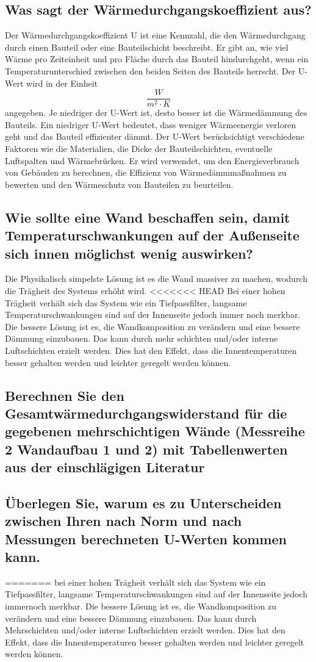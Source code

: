 \subsection{Was sagt der Wärmedurchgangskoeffizient aus?}
Der Wärmedurchgangskoeffizient U ist eine Kennzahl, die den Wärmedurchgang durch einen Bauteil oder eine Bauteilschicht beschreibt. 
Er gibt an, wie viel Wärme pro Zeiteinheit und pro Fläche durch das Bauteil hindurchgeht, wenn ein Temperaturunterschied zwischen den beiden Seiten des Bauteils herrscht.
Der U-Wert wird in der Einheit $$\frac{W}{m^2 \cdot K}$$ angegeben. Je niedriger der U-Wert ist, desto besser ist die Wärmedämmung des Bauteils. 
Ein niedriger U-Wert bedeutet, dass weniger Wärmeenergie verloren geht und das Bauteil effizienter dämmt.
Der U-Wert berücksichtigt verschiedene Faktoren wie die Materialien, die Dicke der Bauteilschichten, eventuelle Luftspalten und Wärmebrücken. 
Er wird verwendet, um den Energieverbrauch von Gebäuden zu berechnen, die Effizienz von Wärmedämmmaßnahmen zu bewerten und den Wärmeschutz von Bauteilen zu beurteilen.
\subsection{Wie sollte eine Wand beschaffen sein, damit Temperaturschwankungen auf der Außenseite sich innen möglichst wenig auswirken?}
Die Physikalisch simpelste Lösung ist es die Wand massiver zu machen, wodurch die Trägheit des Systems erhöht wird.
<<<<<<< HEAD
Bei einer hohen Trägheit verhält sich das System wie ein Tiefpassfilter, langsame Temperaturschwankungen sind auf der Innenseite jedoch immer noch merkbar.
Die bessere Lösung ist es, die Wandkomposition zu verändern und eine bessere Dämmung einzubauen.
Das kann durch mehr schichten und/oder interne Luftschichten erzielt werden.
Dies hat den Effekt, dass die Innentemperaturen besser gehalten werden und leichter geregelt werden können.
\subsection{Berechnen Sie den Gesamtwärmedurchgangswiderstand für die gegebenen mehrschichtigen Wände (Messreihe 2 Wandaufbau 1 und 2) mit Tabellenwerten aus der einschlägigen Literatur}
\subsection{Überlegen Sie, warum es zu Unterscheiden zwischen Ihren nach Norm und nach Messungen berechneten U-Werten kommen kann.}
=======
bei einer hohen Trägheit verhält sich das System wie ein Tiefpassfilter, langsame Temperaturschwankungen sind auf der Innenseite jedoch immernoch merkbar.
Die bessere Lösung ist es, die Wandkomposition zu verändern und eine bessere Dämmung einzubauen.
Das kann durch Mehrschichten und/oder interne Luftschichten erzielt werden.
Dies hat den Effekt, dass die Innentemperaturen besser gehalten werden und leichter geregelt werden können.

